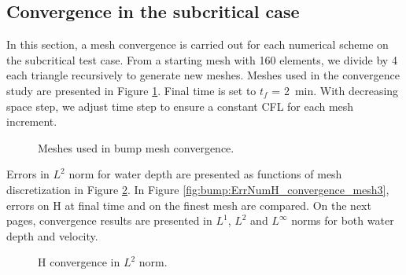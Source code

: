 \subsection{Convergence in the subcritical case}

In this section, a mesh convergence is carried out for each numerical scheme on the subcritical test case.
From a starting mesh with 160 elements, we divide by 4 each triangle recursively to generate new meshes.
Meshes used in the convergence study are presented in Figure \ref{t2d:bump:meshes}.
Final time is set to $t_f$ = 2~min.
With decreasing space step, we adjust time step to ensure a constant CFL for each mesh increment.

\begin{figure}[H]
\begin{minipage}[t]{\textwidth}
 \centering
\end{minipage}
\begin{minipage}[t]{\textwidth}
 \centering
\end{minipage}
\begin{minipage}[t]{\textwidth}
 \centering
\end{minipage}
\begin{minipage}[t]{\textwidth}
 \centering
\end{minipage}
 \caption{Meshes used in bump mesh convergence.}
 \label{t2d:bump:meshes}
\end{figure}

Errors in $L^2$ norm for water depth
are presented as functions of mesh discretization in Figure
\ref{fig:bump:ErrNumH_convergence}. In Figure \ref{fig:bump:ErrNumH_convergence_mesh3}, errors on H
at final time and on the finest mesh are compared.
On the next pages, convergence results are presented in $L^1$, $L^2$ and $L^{\infty}$ norms for both water depth and velocity.

\begin{figure}[H]
\centering
  \caption{H convergence in $L^2$ norm.}
\label{fig:bump:ErrNumH_convergence}
\end{figure}

